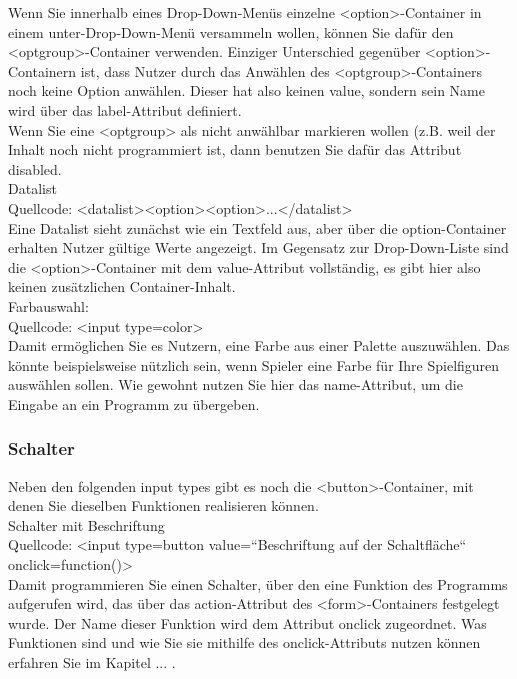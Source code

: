 Wenn Sie innerhalb eines Drop-Down-Menüs einzelne <option>-Container in einem unter-Drop-Down-Menü versammeln wollen, können Sie dafür den <optgroup>-Container verwenden. Einziger Unterschied gegenüber <option>-Containern ist, dass Nutzer durch das Anwählen des <optgroup>-Containers noch keine Option anwählen. Dieser hat also keinen value, sondern sein Name wird über das label-Attribut definiert.\\

Wenn Sie eine <optgroup> als nicht anwählbar markieren wollen (z.B. weil der Inhalt noch nicht programmiert ist, dann benutzen Sie dafür das Attribut disabled.\\

Datalist\\

Quellcode: <datalist><option><option>...</datalist>\\

Eine Datalist sieht zunächst wie ein Textfeld aus, aber über die option-Container erhalten Nutzer gültige Werte angezeigt. Im Gegensatz zur Drop-Down-Liste sind die <option>-Container mit dem value-Attribut vollständig, es gibt hier also keinen zusätzlichen Container-Inhalt.\\

Farbauswahl:\\

Quellcode: <input type=color>\\

Damit ermöglichen Sie es Nutzern, eine Farbe aus einer Palette auszuwählen. Das könnte beispielsweise nützlich sein, wenn Spieler eine Farbe für Ihre Spielfiguren auswählen sollen. Wie gewohnt nutzen Sie hier das name-Attribut, um die Eingabe an ein Programm zu übergeben. 

\subsubsection{Schalter}

Neben den folgenden input types gibt es noch die <button>-Container, mit denen Sie dieselben Funktionen realisieren können.\\

Schalter mit Beschriftung\\

Quellcode: <input type=button value=“Beschriftung auf der Schaltfläche“ onclick=function()>\\

Damit programmieren Sie einen Schalter, über den eine Funktion des Programms aufgerufen wird, das über das action-Attribut des <form>-Containers festgelegt wurde. Der Name dieser Funktion wird dem Attribut onclick zugeordnet. Was Funktionen sind und wie Sie sie mithilfe des onclick-Attributs nutzen können erfahren Sie im Kapitel ... .\\

